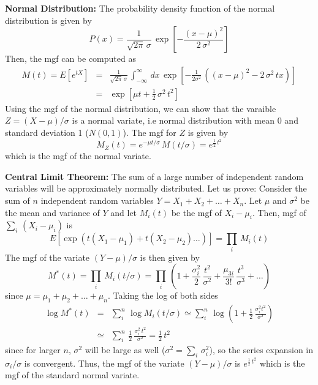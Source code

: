 \documentclass[aps,prl,preprint,superscriptaddress]{revtex4-1}
\begin{document}
{\bf Normal Distribution:} The probability density function of the normal distribution is given by
%
\begin{equation}
P(x) = \frac{1}{\sqrt{2 \pi}\, \sigma}\, \exp\left[ -\frac{(x-\mu)^2}{2\, \sigma^2} \right]
\end{equation}
%
Then, the mgf can be computed as
%
\begin{eqnarray}
M(t) = E[e^{tX}] &=& \frac{1}{\sqrt{2 \pi}\, \sigma}\, \int_{-\infty}^{\infty}\, dx\, \exp\left[ -\frac{1}{2 \sigma^2}\, 
 \left( (x-\mu)^2 - 2\, \sigma^2\, t x \right) \right] \nonumber\\
%
 &=& \exp\left[ \mu t + \frac{1}{2}\, \sigma^2\, t^2 \right]
\end{eqnarray}
%
Using the mgf of the normal distribution, we can show that the varaible $Z = (X - \mu)/\sigma$ is a normal 
variate, i.e normal distribution with mean 0 and standard deviation 1 ($N(0,1)$).
The mgf for $Z$ is given by
%
\begin{equation}
M_Z(t) = e^{-\mu t /\sigma}\, M(t/\sigma) = e^{\frac{1}{2}\, t^2}
\end{equation}
%
which is the mgf of the normal variate.

\vspace{0.5cm}
{\bf Central Limit Theorem:} The sum of a large number of independent random variables will be approximately
normally distributed. Let us prove: Consider the sum of $n$ independent random variables $Y = X_1 + X_2 + \dots + X_n$.
Let $\mu$ and $\sigma^2$ be the mean and variance of $Y$ and
let $M_i(t)$ be the mgf of $X_i - \mu_i$. Then, mgf of $\sum_i\, (X_i - \mu_i)$ is
%
\begin{equation}
 E[\exp( t(X_1-\mu_1) + t(X_2-\mu_2) \dots)] = \prod_i\, M_i(t) 
\end{equation}
%
The mgf of the variate $(Y-\mu)/\sigma$ is then given by
%
\begin{equation}
M^*(t) = \prod_i\, M_i(t/\sigma) = \prod_i\, \left( 1 + \frac{\sigma_i^2}{2}\, \frac{t^2}{\sigma^2} + 
          \frac{\mu_{3i}}{3 !}\, \frac{t^3}{\sigma^3} + \dots \right)
\end{equation}
%
since $\mu = \mu_1 + \mu_2 + \dots + \mu_n$. Taking the log of both sides
%
\begin{eqnarray}
\log M^*(t) &=& \sum_{i}^n\, \log M_i(t/\sigma) \simeq \sum_i^n\, \log \left( 1 + 
                \frac{1}{2}\, \frac{\sigma_i^2 t^2}{\sigma^2} \right) \nonumber\\ 
            &\simeq& \sum_i^n\, \frac{1}{2}\, \frac{\sigma_i^2\, t^2}{\sigma^2} = \frac{1}{2}\, t^2
\end{eqnarray}
%
since for larger $n$, $\sigma^2$ will be large as well ($\sigma^2 = \sum_i\, \sigma_i^2$), so the
series expansion in $\sigma_i/\sigma$ is convergent. Thus, the mgf of the variate
$(Y-\mu)/\sigma$ is $e^{\frac{1}{2}\, t^2}$ which is the mgf of the standard normal variate.
\end{document}
